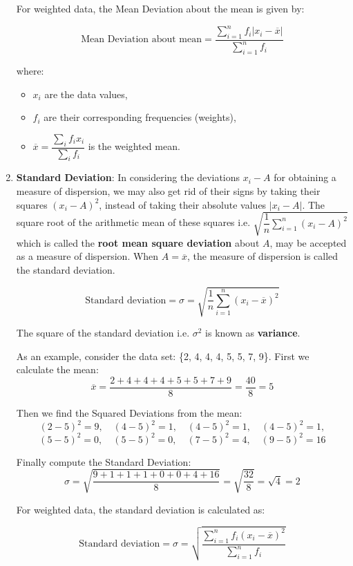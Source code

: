 \documentclass[twoside]{book}
\begin{document}
\begin{enumerate}
For weighted data, the Mean Deviation about the mean is given by:

\begin{textbox}
\[
\text{Mean Deviation about mean} = \frac{\sum_{i=1}^{n} f_i \left| x_i - \overline{x} \right|}{\sum_{i=1}^{n} f_i}
\]
\end{textbox}

where:
\begin{itemize}
    \item \( x_i \) are the data values,
    \item \( f_i \) are their corresponding frequencies (weights),
    \item \( \overline{x} = \dfrac{\sum_i f_i x_i}{\sum_i f_i} \) is the weighted mean.
\end{itemize}

    \item \textbf{Standard Deviation}: In considering the deviations $x_i-A$ for obtaining a measure of dispersion, we may also get rid of their signs by taking their squares $(x_i-A)^2$, instead of taking their absolute values $|x_i-A|$. The square root of the arithmetic mean of these squares i.e. $\sqrt{\dfrac{1}{n}\sum_{i=1}^n(x_i-A)^2}$ which is called the \textbf{root mean square deviation} about $A$, may be accepted as a measure of dispersion. When $A=\overline{x}$, the measure of dispersion is called the standard deviation.
    \begin{textbox}
    \[
    \text{Standard deviation} = \sigma = \sqrt{\frac{1}{n} \sum_{i=1}^{n} (x_i - \overline{x})^2}
    \]
    \end{textbox}
    The square of the standard deviation i.e. $\sigma^2$ is known as \textbf{variance}.

    As an example, consider the data set: \{2, 4, 4, 4, 5, 5, 7, 9\}. First we calculate the mean:
\[
\overline{x} = \frac{2 + 4 + 4 + 4 + 5 + 5 + 7 + 9}{8} = \frac{40}{8} = 5
\]

Then we find the Squared Deviations from the mean:
\[
(2 - 5)^2 = 9,\quad (4 - 5)^2 = 1,\quad (4 - 5)^2 = 1,\quad (4 - 5)^2 = 1,
\]
\[
(5 - 5)^2 = 0,\quad (5 - 5)^2 = 0,\quad (7 - 5)^2 = 4,\quad (9 - 5)^2 = 16
\]

Finally compute the Standard Deviation:
\[
\sigma = \sqrt{\frac{9 + 1 + 1 + 1 + 0 + 0 + 4 + 16}{8}} = \sqrt{\frac{32}{8}} = \sqrt{4} = 2
\]

For weighted data, the standard deviation is calculated as:

\begin{textbox}
\[
\text{Standard deviation} = \sigma = \sqrt{\frac{\sum_{i=1}^n f_i (x_i - \overline{x})^2}{\sum_{i=1}^n f_i}}
\]
\end{textbox}


\end{enumerate}
\end{document}
